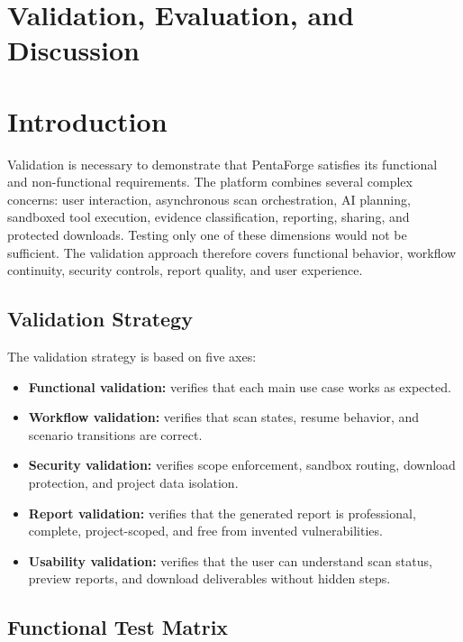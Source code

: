 \documentclass[12pt,a4paper]{report}
\begin{document}
\section{Validation, Evaluation, and Discussion}

\section*{Introduction}

Validation is necessary to demonstrate that PentaForge satisfies its functional and
non-functional requirements. The platform combines several complex concerns: user
interaction, asynchronous scan orchestration, AI planning, sandboxed tool execution,
evidence classification, reporting, sharing, and protected downloads. Testing only one
of these dimensions would not be sufficient. The validation approach therefore covers
functional behavior, workflow continuity, security controls, report quality, and user
experience.

\subsection{Validation Strategy}

The validation strategy is based on five axes:

\begin{itemize}
    \item \textbf{Functional validation:} verifies that each main use case works as
    expected.
    \item \textbf{Workflow validation:} verifies that scan states, resume behavior, and
    scenario transitions are correct.
    \item \textbf{Security validation:} verifies scope enforcement, sandbox routing,
    download protection, and project data isolation.
    \item \textbf{Report validation:} verifies that the generated report is professional,
    complete, project-scoped, and free from invented vulnerabilities.
    \item \textbf{Usability validation:} verifies that the user can understand scan
    status, preview reports, and download deliverables without hidden steps.
\end{itemize}

\subsection{Functional Test Matrix}
\end{document}
